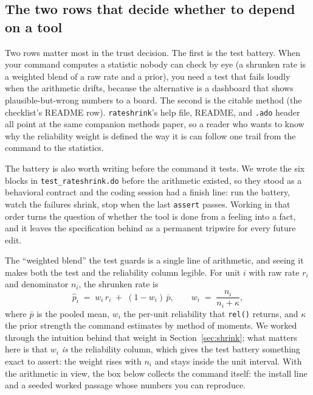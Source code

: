 \subsection{The two rows that decide whether to depend on a tool}\label{sec:ch15-trust-rows}
Two rows matter most in the trust decision. The first is the test battery. When your command computes a statistic nobody can check by eye (a shrunken rate is a weighted blend of a raw rate and a prior), you need a test that fails loudly when the arithmetic drifts, because the alternative is a dashboard that shows plausible-but-wrong numbers to a board. The second is the citable method (the checklist's README row). \texttt{rateshrink}'s help file, README, and \texttt{.ado} header all point at the same companion methods paper, so a reader who wants to know why the reliability weight is defined the way it is can follow one trail from the command to the statistics.

The battery is also worth writing before the command it tests. We wrote the six blocks in \texttt{test\_rateshrink.do} before the arithmetic existed, so they stood as a behavioral contract and the coding session had a finish line: run the battery, watch the failures shrink, stop when the last \texttt{assert} passes. Working in that order turns the question of whether the tool is done from a feeling into a fact, and it leaves the specification behind as a permanent tripwire for every future edit.

The \enquote{weighted blend} the test guards is a single line of arithmetic, and seeing it makes both the test and the reliability column legible. For unit $i$ with raw rate $r_i$ and denominator $n_i$, the shrunken rate is
\[
  \hat{p}_i \;=\; w_i\,r_i \;+\; (1-w_i)\,\bar{p},
  \qquad
  w_i \;=\; \frac{n_i}{n_i + \kappa},
\]
where $\bar p$ is the pooled mean, $w_i$ the per-unit reliability that \texttt{rel()} returns, and $\kappa$ the prior strength the command estimates by method of moments. We worked through the intuition behind that weight in Section~\ref{sec:shrink}; what matters here is that $w_i$ \emph{is} the reliability column, which gives the test battery something exact to assert: the weight rises with $n_i$ and stays inside the unit interval. With the arithmetic in view, the box below collects the command itself: the install line and a seeded worked passage whose numbers you can reproduce.

